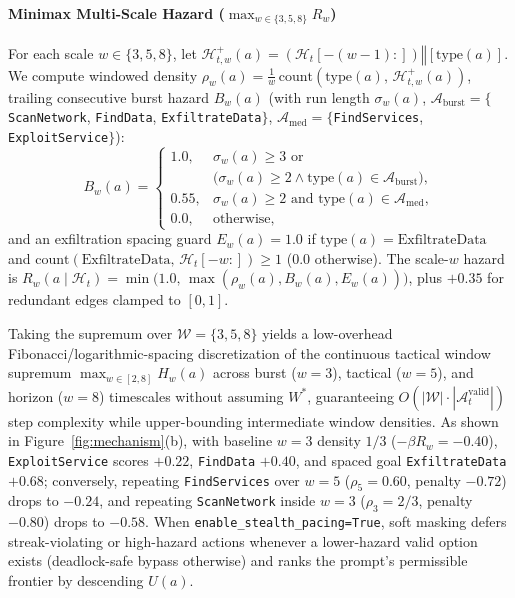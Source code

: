 \documentclass[a4paper,fleqn]{cas-dc}
\begin{document}
\paragraph{Minimax Multi-Scale Hazard ($\max_{w \in \{3,5,8\}} R_w$)}
For each scale $w \in \{3, 5, 8\}$, let $\mathcal{H}_{t,w}^{+}(a) = (\mathcal{H}_t[-(w-1):]) \mathbin{\Vert} [\mathrm{type}(a)]$. We compute windowed density $\rho_w(a) = \frac{1}{w}\,\mathrm{count}(\mathrm{type}(a),\, \mathcal{H}_{t,w}^{+}(a))$, trailing consecutive burst hazard $B_w(a)$ (with run length $\sigma_w(a)$, $\mathcal{A}_{\mathrm{burst}} = \{$\texttt{ScanNetwork}, \texttt{FindData}, \texttt{ExfiltrateData}$\}$, $\mathcal{A}_{\mathrm{med}} = \{$\texttt{FindServices}, \texttt{ExploitService}$\}$):
\begin{equation}
    B_w(a) = \begin{cases}
        1.0, & \sigma_w(a) \ge 3 \text{ or} \\
             & \big(\sigma_w(a) \ge 2 \land \mathrm{type}(a) \in \mathcal{A}_{\mathrm{burst}}\big), \\
        0.55, & \sigma_w(a) \ge 2 \text{ and } \mathrm{type}(a) \in \mathcal{A}_{\mathrm{med}}, \\
        0.0, & \text{otherwise},
    \end{cases}
    \label{eq:burst_hazard}
\end{equation}
and an exfiltration spacing guard $E_w(a) = 1.0$ if $\mathrm{type}(a) = \mathrm{ExfiltrateData}$ and $\mathrm{count}(\mathrm{ExfiltrateData},\, \mathcal{H}_t[-w:]) \ge 1$ ($0.0$ otherwise). The scale-$w$ hazard is $R_w(a \mid \mathcal{H}_t) = \min\big(1.0,\, \max(\rho_w(a), B_w(a), E_w(a))\big)$, plus $+0.35$ for redundant edges clamped to $[0, 1]$.

Taking the supremum over $\mathcal{W} = \{3, 5, 8\}$ yields a low-overhead Fibonacci/logarithmic-spacing discretization of the continuous tactical window supremum $\max_{w \in [2, 8]} H_w(a)$ across burst ($w=3$), tactical ($w=5$), and horizon ($w=8$) timescales without assuming $W^*$, guaranteeing $O(|\mathcal{W}| \cdot |\mathcal{A}^{\text{valid}}_t|)$ step complexity while upper-bounding intermediate window densities. As shown in Figure~\ref{fig:mechanism}(b), with baseline $w=3$ density $1/3$ ($-\beta R_w = -0.40$), \texttt{ExploitService} scores $+0.22$, \texttt{FindData} $+0.40$, and spaced goal \texttt{ExfiltrateData} $+0.68$; conversely, repeating \texttt{FindServices} over $w=5$ ($\rho_5 = 0.60$, penalty $-0.72$) drops to $-0.24$, and repeating \texttt{ScanNetwork} inside $w=3$ ($\rho_3 = 2/3$, penalty $-0.80$) drops to $-0.58$. When \texttt{enable\_stealth\_pacing=True}, soft masking defers streak-violating or high-hazard actions whenever a lower-hazard valid option exists (deadlock-safe bypass otherwise) and ranks the prompt's permissible frontier by descending $U(a)$.
\end{document}
